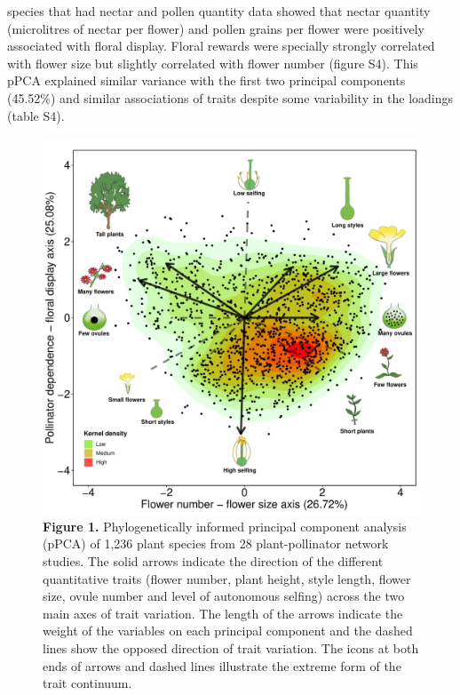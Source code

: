 \documentclass[
  12pt,
  a4paper,
]{article}
\begin{document}
species that had nectar and pollen quantity data showed that nectar quantity (microlitres of nectar per flower) and pollen grains per flower were positively associated with floral display. Floral rewards were specially strongly correlated with flower size but slightly correlated with flower number (figure S4). This pPCA explained similar variance with the first two principal components (45.52\%) and similar associations of traits despite some variability in the loadings (table S4).

\begin{figure}[H]

{\centering \includegraphics[width=0.95\linewidth]{output/figures/unnamed-chunk-2-1} 

}

\caption{\textbf{Figure 1.} Phylogenetically informed principal component analysis (pPCA) of 1,236 plant species from 28 plant-pollinator network studies. The solid arrows indicate the direction of the different quantitative traits (flower number, plant height, style length, flower size, ovule number and level of autonomous selfing) across the two main axes of trait variation. The length of the arrows indicate the weight of the variables on each principal component and the dashed lines show the opposed direction of trait variation. The icons at both ends of arrows and dashed lines illustrate the extreme form of the trait continuum.}\label{fig:unnamed-chunk-2}
\end{figure}
\end{document}
